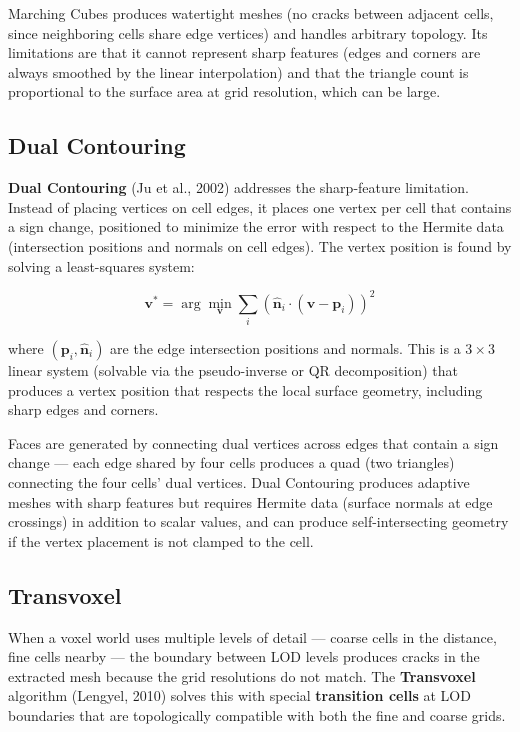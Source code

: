\documentclass[
  11pt,
  letterpaper,
  DIV=11,
  numbers=noendperiod,
  twoside,
  open=right]{scrreprt}
\begin{document}
Marching Cubes produces watertight meshes (no cracks between adjacent
cells, since neighboring cells share edge vertices) and handles
arbitrary topology. Its limitations are that it cannot represent sharp
features (edges and corners are always smoothed by the linear
interpolation) and that the triangle count is proportional to the
surface area at grid resolution, which can be large.

\subsection{Dual Contouring}\label{dual-contouring}

\textbf{Dual Contouring} (Ju et al., 2002) addresses the sharp-feature
limitation. Instead of placing vertices on cell edges, it places one
vertex per cell that contains a sign change, positioned to minimize the
error with respect to the Hermite data (intersection positions and
normals on cell edges). The vertex position is found by solving a
least-squares system:

\[
\mathbf{v}^* = \arg\min_{\mathbf{v}} \sum_i (\hat{\mathbf{n}}_i \cdot (\mathbf{v} - \mathbf{p}_i))^2
\]

where \((\mathbf{p}_i, \hat{\mathbf{n}}_i)\) are the edge intersection
positions and normals. This is a \(3 \times 3\) linear system (solvable
via the pseudo-inverse or QR decomposition) that produces a vertex
position that respects the local surface geometry, including sharp edges
and corners.

Faces are generated by connecting dual vertices across edges that
contain a sign change --- each edge shared by four cells produces a quad
(two triangles) connecting the four cells' dual vertices. Dual
Contouring produces adaptive meshes with sharp features but requires
Hermite data (surface normals at edge crossings) in addition to scalar
values, and can produce self-intersecting geometry if the vertex
placement is not clamped to the cell.

\subsection{Transvoxel}\label{transvoxel}

When a voxel world uses multiple levels of detail --- coarse cells in
the distance, fine cells nearby --- the boundary between LOD levels
produces cracks in the extracted mesh because the grid resolutions do
not match. The \textbf{Transvoxel} algorithm (Lengyel, 2010) solves this
with special \textbf{transition cells} at LOD boundaries that are
topologically compatible with both the fine and coarse grids.
\end{document}
